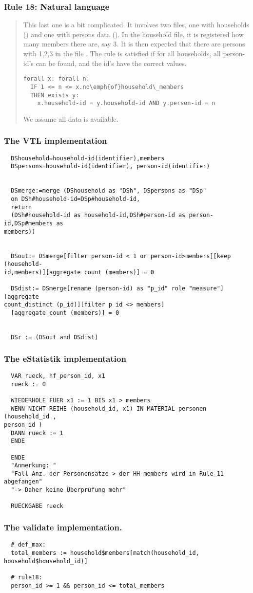 \subsubsection*{  Rule 18: Natural language}
\begin{quote}


This last one is a bit complicated. It involves two files, one with households () and one with persons data (). In the household file, it is registered how many members there are, say 3. It is then expected that
there are persons with  1,2,3 in the file . The rule is satisfied if for all households, all person-id's can be found, and the id's have the correct values.


\begin{verbatim}
forall x: forall n:
  IF 1 <= n <= x.no\emph{of}household\_members
  THEN exists y: 
    x.household-id = y.household-id AND y.person-id = n
\end{verbatim}


We assume all data is available.

\end{quote}
\subsubsection*{The VTL implementation}
\begin{verbatim}
  DShousehold=household-id(identifier),members
  DSpersons=household-id(identifier), person-id(identifier)


  DSmerge:=merge (DShousehold as "DSh", DSpersons as "DSp"
  on DSh#household-id=DSp#household-id,
  return
  (DSh#household-id as household-id,DSh#person-id as person-id,DSp#members as
members))


  DSout:= DSmerge[filter person-id < 1 or person-id>members][keep (household-
id,members)][aggregate count (members)] = 0

  DSdist:= DSmerge[rename (person-id) as "p_id" role "measure"][aggregate
count_distinct (p_id)][filter p id <> members]
  [aggregate count (members)] = 0


  DSr := (DSout and DSdist)

\end{verbatim}
\subsubsection*{The eStatistik implementation}
\begin{verbatim}
  VAR rueck, hf_person_id, x1
  rueck := 0

  WIEDERHOLE FUER x1 := 1 BIS x1 > members
  WENN NICHT REIHE (household_id, x1) IN MATERIAL personen (household_id ,
person_id )
  DANN rueck := 1
  ENDE

  ENDE
  "Anmerkung: "
  "Fall Anz. der Personensätze > der HH-members wird in Rule_11 abgefangen"
  "-> Daher keine Überprüfung mehr"

  RUECKGABE rueck
\end{verbatim}
\subsubsection*{The validate implementation.}
\begin{verbatim}
  # def_max:
  total_members := household$members[match(household_id, household$household_id)]

  # rule18:
  person_id >= 1 && person_id <= total_members
\end{verbatim}

